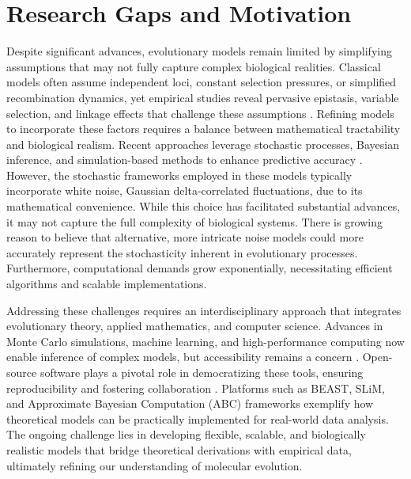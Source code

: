 \section{Research Gaps and Motivation}
Despite significant advances, evolutionary models remain limited by simplifying assumptions that may not fully capture complex biological realities. Classical models often assume independent loci, constant selection pressures, or simplified recombination dynamics, yet empirical studies reveal pervasive epistasis, variable selection, and linkage effects that challenge these assumptions \cite{lunzer2010pervasive, neher2009competition}. Refining models to incorporate these factors requires a balance between mathematical tractability and biological realism. Recent approaches leverage stochastic processes, Bayesian inference, and simulation-based methods to enhance predictive accuracy \cite{csillery2010approximate, meyer2017accelerating}. However, the stochastic frameworks employed in these models typically incorporate white noise, Gaussian delta-correlated fluctuations, due to its mathematical convenience. While this choice has facilitated substantial advances, it may not capture the full complexity of biological systems. There is growing reason to believe that alternative, more intricate noise models could more accurately represent the stochasticity inherent in evolutionary processes. Furthermore, computational demands grow exponentially, necessitating efficient algorithms and scalable implementations.


Addressing these challenges requires an interdisciplinary approach that integrates evolutionary theory, applied mathematics, and computer science. Advances in Monte Carlo simulations, machine learning, and high-performance computing now enable inference of complex models, but accessibility remains a concern \cite{bryant2017special}. Open-source software plays a pivotal role in democratizing these tools, ensuring reproducibility and fostering collaboration \cite{bouckaert2014beast, haller2019slim}. Platforms such as BEAST, SLiM, and Approximate Bayesian Computation (ABC) frameworks exemplify how theoretical models can be practically implemented for real-world data analysis. The ongoing challenge lies in developing flexible, scalable, and biologically realistic models that bridge theoretical derivations with empirical data, ultimately refining our understanding of molecular evolution.


